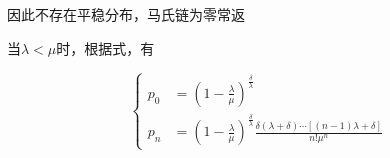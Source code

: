 \documentclass{../notes}
\begin{document}
\begin{subquestions}
        因此不存在平稳分布，马氏链为零常返

        \item 当$\lambda < \mu$时，根据式，有

        \begin{equation}
        \left\{
        \begin{aligned}
            p_{0} &= \left(1 - \frac{\lambda}{\mu}\right)^{\frac{\delta}{\lambda}} \\
            p_n &= \left(1 - \frac{\lambda}{\mu}\right)^{\frac{\delta}{\lambda}}\frac{\delta(\lambda + \delta)\cdots\left[(n-1)\lambda + \delta\right]}{n!\mu^n}
        \end{aligned}
        \right.
        \end{equation}
    \end{subquestions}
\end{document}
